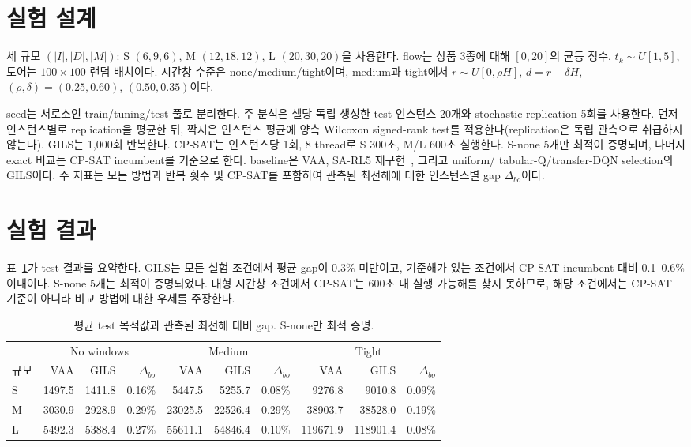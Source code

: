 \documentclass[11pt,a4paper]{article}
\begin{document}
\section{실험 설계}

세 규모 $(|I|,|D|,|M|)$: S $(6,9,6)$, M $(12,18,12)$, L $(20,30,20)$을 사용한다.
flow는 상품 3종에 대해 $[0,20]$의 균등 정수, $t_k\sim U[1,5]$, 도어는
$100\times100$ 랜덤 배치이다. 시간창 수준은 none/medium/tight이며, medium과
tight에서 $r\sim U[0,\rho H]$, $\bar d=r+\delta H$, $(\rho,\delta)=(0.25,0.60)$,
$(0.50,0.35)$이다.

seed는 서로소인 train/tuning/test 풀로 분리한다. 주 분석은 셀당 독립 생성한
test 인스턴스 20개와 stochastic replication 5회를 사용한다. 먼저 인스턴스별로
replication을 평균한 뒤, 짝지은 인스턴스 평균에 양측 Wilcoxon signed-rank test를
적용한다(replication은 독립 관측으로 취급하지 않는다). GILS는 1{,}000회
반복한다. CP-SAT는 인스턴스당 1회, 8 thread로 S 300초, M/L 600초 실행한다.
S-none 5개만 최적이 증명되며, 나머지 exact 비교는 CP-SAT incumbent를 기준으로
한다. baseline은 VAA, SA-RL5 재구현~\cite{shahmardan2020}, 그리고 uniform/
tabular-Q/transfer-DQN selection의 GILS이다. 주 지표는 모든 방법과 반복 횟수 및 CP-SAT를
포함하여 관측된 최선해에 대한 인스턴스별 gap $\Delta_{bo}$이다.

\section{실험 결과}

표~\ref{tab:quality}가 test 결과를 요약한다. GILS는 모든 실험 조건에서 평균 gap이
0.3\% 미만이고, 기준해가 있는 조건에서 CP-SAT incumbent 대비 0.1--0.6\% 이내이다.
S-none 5개는 최적이 증명되었다. 대형 시간창 조건에서 CP-SAT는 600초 내 실행 가능해를
찾지 못하므로, 해당 조건에서는 CP-SAT 기준이 아니라 비교 방법에 대한 우세를
주장한다.

\begin{table}[t]
\centering
\caption{평균 test 목적값과 관측된 최선해 대비 gap. S-none만 최적 증명.}
\label{tab:quality}
\small
\begin{tabular}{@{}lrrrrrrrrr@{}}
\toprule
& \multicolumn{3}{c}{No windows} & \multicolumn{3}{c}{Medium} & \multicolumn{3}{c}{Tight}\\
\cmidrule(lr){2-4}\cmidrule(lr){5-7}\cmidrule(lr){8-10}
규모 & VAA & GILS & $\Delta_{bo}$ & VAA & GILS & $\Delta_{bo}$ & VAA & GILS & $\Delta_{bo}$\\
\midrule
S & 1497.5 & 1411.8 & 0.16\% & 5447.5 & 5255.7 & 0.08\% & 9276.8 & 9010.8 & 0.09\%\\
M & 3030.9 & 2928.9 & 0.29\% & 23025.5 & 22526.4 & 0.29\% & 38903.7 & 38528.0 & 0.19\%\\
L & 5492.3 & 5388.4 & 0.27\% & 55611.1 & 54846.4 & 0.10\% & 119671.9 & 118901.4 & 0.08\%\\
\bottomrule
\end{tabular}
\end{table}
\end{document}
